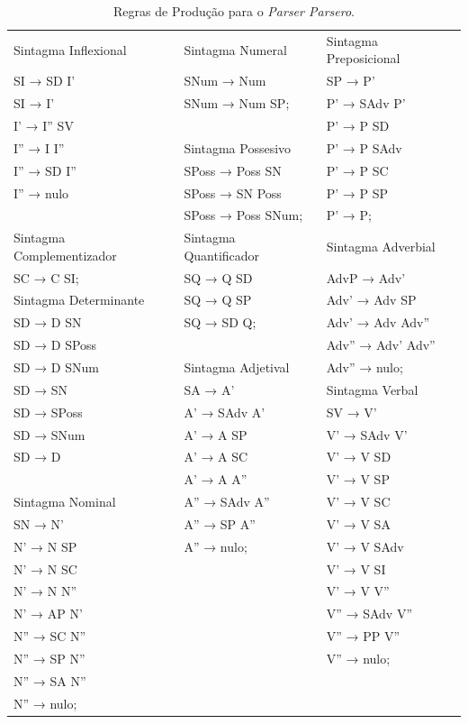 \documentclass[portuguese]{textolivre}
\begin{document}
\begin{table}[htbp]
\caption{Regras de Produção para o \textit{Parser Parsero}.}
\label{tbl2}
\centering
\begin{tabular}{| l | l | l |}
\hline
Sintagma Inflexional & Sintagma Numeral & Sintagma Preposicional \\ 
SI → SD I' & SNum → Num & SP → P' \\
SI → I' & SNum → Num SP; & P' → SAdv P' \\
I' → I'' SV & &  P' → P SD \\
I'' → I I'' & Sintagma Possesivo & P' → P SAdv \\
I'' → SD I'' & SPoss → Poss SN & P' → P SC \\
I'' → nulo & SPoss → SN Poss & P' → P SP \\
 & SPoss → Poss SNum; & P' → P; \\
Sintagma Complementizador & Sintagma Quantificador & Sintagma Adverbial \\
SC → C SI; & SQ → Q SD & AdvP → Adv' \\
Sintagma Determinante &  SQ → Q SP & Adv' → Adv SP \\
SD → D SN & SQ → SD Q; & Adv' → Adv Adv'' \\
SD → D SPoss &   & Adv'' → Adv' Adv'' \\
SD → D SNum & Sintagma Adjetival & Adv'' → nulo; \\
SD → SN & SA → A' & Sintagma Verbal \\
SD → SPoss & A' → SAdv A' & SV → V' \\
SD → SNum & A' → A SP & V' → SAdv V' \\
SD → D & A' → A SC & V' → V SD \\
 & A' → A A''& V' → V SP \\ 
Sintagma Nominal & A'' → SAdv A'' & V' → V SC \\ 
SN → N' & A'' → SP A'' & V' → V SA \\ 
N' → N SP & A'' → nulo; & V' → V SAdv \\ 
N' → N SC &  & V' → V SI \\ 
N' → N N'' &  & V' → V V'' \\ 
N' → AP N' &  & V'' → SAdv V'' \\ 
N'' → SC N'' &  & V'' → PP V'' \\ 
N'' → SP N'' &  & V'' → nulo; \\ 
N'' → SA N'' &  & \\ 
N'' → nulo; &  &  \\ 
\hline
\end{tabular}
\end{table}
\end{document}
